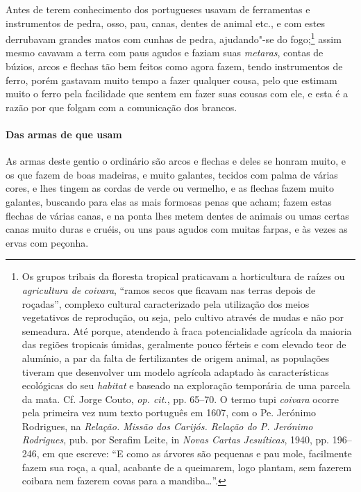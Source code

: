  Antes de terem conhecimento dos portugueses usavam de ferramentas e
instrumentos de pedra, osso, pau, canas, dentes de animal etc., e com
estes derrubavam grandes matos com cunhas de pedra, ajudando"-se do
fogo;\footnote{ Os grupos tribais da floresta tropical praticavam a
horticultura de raízes ou \textit{agricultura de} \textit{coivara}, 
``ramos secos que ficavam nas terras depois de roçadas'', complexo
cultural caracterizado pela utilização dos meios vegetativos de
reprodução, ou seja, pelo cultivo através de mudas e não por semeadura.
Até porque, atendendo à fraca potencialidade agrícola da maioria das
regiões tropicais úmidas, geralmente pouco férteis e com elevado teor
de alumínio, a par da falta de fertilizantes de origem animal, as
populações tiveram que desenvolver um modelo agrícola adaptado às
características ecológicas do seu \textit{habitat} e baseado na
exploração temporária de uma parcela da mata. Cf. Jorge Couto, 
\textit{op. cit.}, pp. 65--70. O termo tupi \textit{coivara} ocorre pela
primeira vez num texto português em 1607, com o Pe. Jerónimo
Rodrigues, na \textit{Relação. Missão dos Carijós. Relação do P.
Jerónimo Rodrigues}, pub. por Serafim Leite, in \textit{Novas Cartas
Jesuíticas}, 1940, pp. 196--246, em que escreve: ``E como as
árvores são pequenas e pau mole, facilmente fazem sua roça, a qual,
acabante de a queimarem, logo plantam, sem fazerem coibara nem fazerem
covas para a mandiba\ldots''.} assim mesmo cavavam a terra com paus agudos
e faziam suas \textit{metaras}, contas de búzios, arcos e flechas tão
bem feitos como agora fazem, tendo instrumentos de ferro, porém
gastavam muito tempo a fazer qualquer cousa, pelo que estimam muito o
ferro pela facilidade que sentem em fazer suas cousas com ele, e esta é
a razão por que folgam com a comunicação dos brancos.

\paragraph{Das armas de que usam}

As armas deste gentio o ordinário são arcos e flechas e deles
se honram muito, e os que fazem de boas madeiras, e muito galantes,
tecidos com palma de várias cores, e lhes tingem as cordas de verde ou
vermelho, e as flechas fazem muito galantes, buscando para elas as mais
formosas penas que acham; fazem estas flechas de várias canas, e na
ponta lhes metem dentes de animais ou umas certas canas muito duras e
cruéis, ou uns paus agudos com muitas farpas, e às vezes as ervas com peçonha. 

